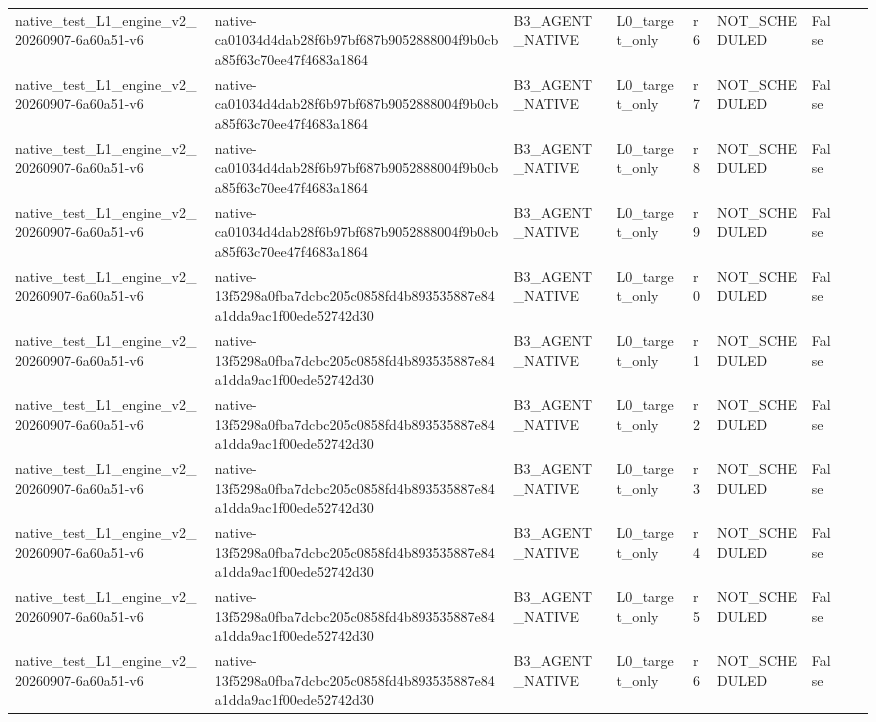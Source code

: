 \begin{tabular}{lllllllll}
native\_test\_L1\_engine\_v2\_20260907-6a60a51-v6 & native-ca01034d4dab28f6b97bf687b9052888004f9b0cba85f63c70ee47f4683a1864 & B3\_AGENT\_NATIVE & L0\_target\_only & r6 & NOT\_SCHEDULED & False &  &  \\
native\_test\_L1\_engine\_v2\_20260907-6a60a51-v6 & native-ca01034d4dab28f6b97bf687b9052888004f9b0cba85f63c70ee47f4683a1864 & B3\_AGENT\_NATIVE & L0\_target\_only & r7 & NOT\_SCHEDULED & False &  &  \\
native\_test\_L1\_engine\_v2\_20260907-6a60a51-v6 & native-ca01034d4dab28f6b97bf687b9052888004f9b0cba85f63c70ee47f4683a1864 & B3\_AGENT\_NATIVE & L0\_target\_only & r8 & NOT\_SCHEDULED & False &  &  \\
native\_test\_L1\_engine\_v2\_20260907-6a60a51-v6 & native-ca01034d4dab28f6b97bf687b9052888004f9b0cba85f63c70ee47f4683a1864 & B3\_AGENT\_NATIVE & L0\_target\_only & r9 & NOT\_SCHEDULED & False &  &  \\
native\_test\_L1\_engine\_v2\_20260907-6a60a51-v6 & native-13f5298a0fba7dcbc205c0858fd4b893535887e84a1dda9ac1f00ede52742d30 & B3\_AGENT\_NATIVE & L0\_target\_only & r0 & NOT\_SCHEDULED & False &  &  \\
native\_test\_L1\_engine\_v2\_20260907-6a60a51-v6 & native-13f5298a0fba7dcbc205c0858fd4b893535887e84a1dda9ac1f00ede52742d30 & B3\_AGENT\_NATIVE & L0\_target\_only & r1 & NOT\_SCHEDULED & False &  &  \\
native\_test\_L1\_engine\_v2\_20260907-6a60a51-v6 & native-13f5298a0fba7dcbc205c0858fd4b893535887e84a1dda9ac1f00ede52742d30 & B3\_AGENT\_NATIVE & L0\_target\_only & r2 & NOT\_SCHEDULED & False &  &  \\
native\_test\_L1\_engine\_v2\_20260907-6a60a51-v6 & native-13f5298a0fba7dcbc205c0858fd4b893535887e84a1dda9ac1f00ede52742d30 & B3\_AGENT\_NATIVE & L0\_target\_only & r3 & NOT\_SCHEDULED & False &  &  \\
native\_test\_L1\_engine\_v2\_20260907-6a60a51-v6 & native-13f5298a0fba7dcbc205c0858fd4b893535887e84a1dda9ac1f00ede52742d30 & B3\_AGENT\_NATIVE & L0\_target\_only & r4 & NOT\_SCHEDULED & False &  &  \\
native\_test\_L1\_engine\_v2\_20260907-6a60a51-v6 & native-13f5298a0fba7dcbc205c0858fd4b893535887e84a1dda9ac1f00ede52742d30 & B3\_AGENT\_NATIVE & L0\_target\_only & r5 & NOT\_SCHEDULED & False &  &  \\
native\_test\_L1\_engine\_v2\_20260907-6a60a51-v6 & native-13f5298a0fba7dcbc205c0858fd4b893535887e84a1dda9ac1f00ede52742d30 & B3\_AGENT\_NATIVE & L0\_target\_only & r6 & NOT\_SCHEDULED & False &  &  \\

\end{tabular}
